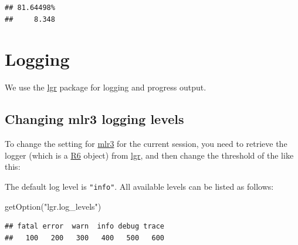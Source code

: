\documentclass[
]{scrbook}
\newenvironment{Shaded}{\begin{snugshade}}{\end{snugshade}}
\newcommand{\FunctionTok}[1]{\textcolor[rgb]{0.00,0.00,0.00}{#1}}
\newcommand{\NormalTok}[1]{#1}
\newcommand{\OtherTok}[1]{\textcolor[rgb]{0.56,0.35,0.01}{#1}}
\newcommand{\SpecialCharTok}[1]{\textcolor[rgb]{0.00,0.00,0.00}{#1}}
\newcommand{\StringTok}[1]{\textcolor[rgb]{0.31,0.60,0.02}{#1}}
\renewenvironment{Shaded} {\begin{snugshade}\small} {\end{snugshade}}
\begin{document}
\begin{verbatim}
## 81.64498% 
##     8.348
\end{verbatim}

\hypertarget{logging}{%
\section{Logging}\label{logging}}

We use the \href{https://cran.r-project.org/package=lgr}{lgr} package for logging and progress output.

\hypertarget{changing-mlr3-logging-levels}{%
\subsection{Changing mlr3 logging levels}\label{changing-mlr3-logging-levels}}

To change the setting for \href{https://mlr3.mlr-org.com}{mlr3} for the current session, you need to retrieve the logger (which is a \href{https://cran.r-project.org/package=R6}{R6} object) from \href{https://cran.r-project.org/package=lgr}{lgr}, and then change the threshold of the like this:

\begin{Shaded}
\end{Shaded}

The default log level is \texttt{"info"}.
All available levels can be listed as follows:

\begin{Shaded}
\begin{Highlighting}[]
\FunctionTok{getOption}\NormalTok{(}\StringTok{"lgr.log\_levels"}\NormalTok{)}
\end{Highlighting}
\end{Shaded}

\begin{verbatim}
## fatal error  warn  info debug trace 
##   100   200   300   400   500   600
\end{verbatim}
\end{document}

